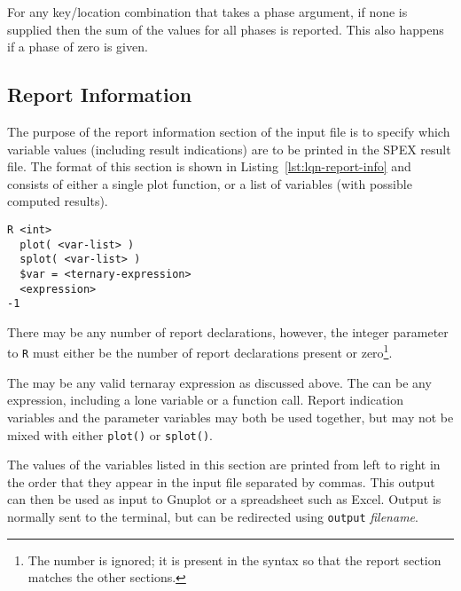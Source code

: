 For any key/location combination that takes a phase argument, if none
is supplied then the sum of the values for all phases is reported.
This also happens if a phase of zero is given.

\label{sec:spex-variables|)}

\subsection{Report Information}
\label{sec:lqn-report-information}

The purpose of the report information section of the input file is to specify which variable values
(including result indications) are to be printed in the SPEX result file.  The format of this section is
shown in Listing~\ref{lst:lqn-report-info} and consists of either a single plot
function, or a list of variables (with possible computed results).  

\lstset{language=LQN,basicstyle=\ttfamily,numbersep=10pt,firstnumber=1}
\begin{lstlisting}[caption={Report Information},label=lst:lqn-report-info,frame=single,float]
R <int>
  plot( <var-list> )
  splot( <var-list> )
  $var = <ternary-expression>
  <expression>
-1
\end{lstlisting}

There may be any number of report declarations, however, the integer parameter to \texttt{R} must either be
the number of report declarations present or zero\footnote{The number is ignored; it is present in the
syntax so that the report section matches the other sections.}.

The  may be any valid ternaray expression as discussed above.  The
 can be any expression, including a lone variable or a function call.  Report
indication variables and the parameter
variables may both be used together, but may not be mixed with either
\texttt{plot()} or \texttt{splot()}.

The values of the variables listed in this
section are printed from left to right in the order that they appear in the input file separated by commas.
This output can then be used as input to Gnuplot or a spreadsheet such as
Excel.  Output is normally sent to the terminal, but can be redirected using \texttt{output} \emph{filename}.

